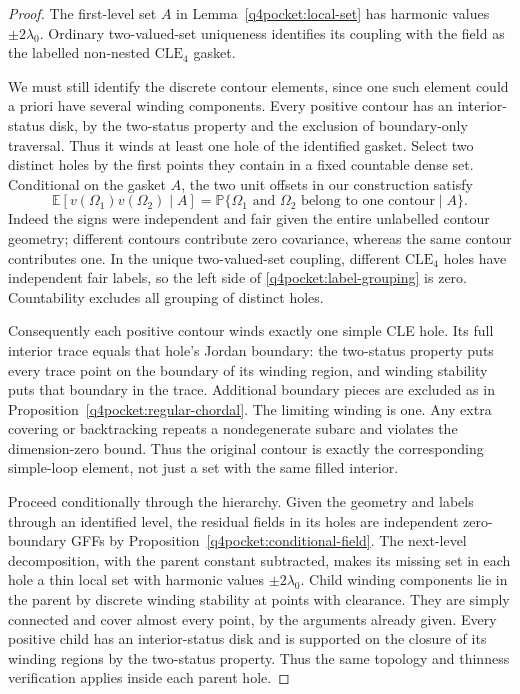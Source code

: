 \begin{proof}
The first-level set $A$ in Lemma~\ref{q4pocket:local-set}
has harmonic values $\pm2\lambda_0$.  Ordinary two-valued-set
uniqueness identifies its coupling with the field as the
labelled non-nested $\mathrm{CLE}_4$ gasket.

We must still identify the discrete contour elements, since
one such element could a priori have several winding
components.  Every positive contour has an interior-status
disk, by the two-status property and the exclusion of
boundary-only traversal.  Thus it winds at least one hole
of the identified gasket.  Select two distinct holes by
the first points they contain in a fixed countable dense
set.  Conditional on the gasket $A$, the two unit offsets
in our construction satisfy
\begin{equation}
 \mathbb E[v(\Omega_1)v(\Omega_2)\mid A]
 =\mathbb P\{\Omega_1\text{ and }\Omega_2
        \text{ belong to one contour}\mid A\}.
 \label{q4pocket:label-grouping}
\end{equation}
Indeed the signs were independent and fair given the entire
unlabelled contour geometry; different contours contribute
zero covariance, whereas the same contour contributes one.
In the unique two-valued-set coupling, different
$\mathrm{CLE}_4$ holes have independent fair labels, so the
left side of \eqref{q4pocket:label-grouping} is zero.
Countability excludes all grouping of distinct holes.

Consequently each positive contour winds exactly one simple
CLE hole.  Its full interior trace equals that hole's Jordan
boundary: the two-status property puts every trace point
on the boundary of its winding region, and winding stability
puts that boundary in the trace.  Additional boundary pieces
are excluded as in Proposition~\ref{q4pocket:regular-chordal}.
The limiting winding is one.  Any extra covering or
backtracking repeats a nondegenerate subarc and violates the
dimension-zero bound.  Thus the original contour is exactly
the corresponding simple-loop element, not just a set with
the same filled interior.

Proceed conditionally through the hierarchy.  Given the
geometry and labels through an identified level, the
residual fields in its holes are independent zero-boundary
GFFs by Proposition~\ref{q4pocket:conditional-field}.  The
next-level decomposition, with the parent constant subtracted,
makes its missing set in each hole a thin local set with
harmonic values $\pm2\lambda_0$.  Child winding components
lie in the parent by discrete winding stability at points
with clearance.  They are simply connected and cover almost
every point, by the arguments already given.  Every positive
child has an interior-status disk and is supported on the
closure of its winding regions by the two-status property.
Thus the same topology and thinness verification applies
inside each parent hole.


\end{proof}
